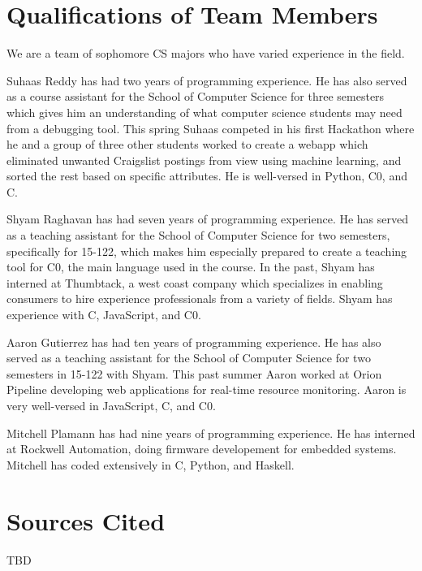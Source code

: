 \documentclass[11pt]{article}
\begin{document}
\section{Qualifications of Team Members}
\par
We are a team of sophomore CS majors who have varied experience in the field.
\par
Suhaas Reddy has had two years of programming experience.  He has also served
as a course assistant for the School of Computer Science for three semesters
which gives him an understanding of what computer science students may need
from a debugging tool. This spring Suhaas competed in his first Hackathon where
he and a group of three other students worked to create a webapp which
eliminated unwanted Craigslist postings from view using machine learning, and
sorted the rest based on specific attributes.  He is well-versed in Python, C0,
and C.
\par
Shyam Raghavan has had seven years of programming experience.  He has served as
a teaching assistant for the School of Computer Science for two semesters,
specifically for 15-122, which makes him especially prepared to create a
teaching tool for C0, the main language used in the course.  In the past, Shyam
has interned at Thumbtack, a west coast company which specializes in enabling
consumers to hire experience professionals from a variety of fields.  Shyam has
experience with C, JavaScript, and C0.
\par
Aaron Gutierrez has had ten years of programming experience.  He has also served
as a teaching assistant for the School of Computer Science for two semesters in
15-122 with Shyam. This past summer Aaron worked at Orion Pipeline developing
web applications for real-time resource monitoring. Aaron is very well-versed in
JavaScript, C, and C0.
\par
Mitchell Plamann has had nine years of programming experience.  He has interned
at Rockwell Automation, doing firmware developement for embedded systems.
Mitchell has coded extensively in C, Python, and Haskell.

\section{Sources Cited}
TBD
\end{document}
